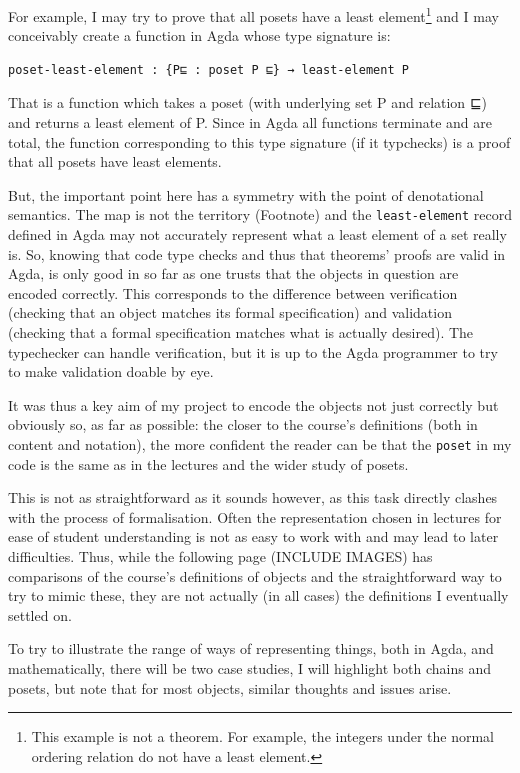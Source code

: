 \documentclass[12pt,a4paper,twoside,openright]{report}
\begin{document}
For example, I may try to prove that all posets have a least element\footnote{This example is not a theorem. For example, the integers under the normal ordering relation do not have a least element.} and I may conceivably create a function in Agda whose type signature is:
\begin{verbatim}
poset-least-element : {P⊑ : poset P ⊑} → least-element P
\end{verbatim}
That is a function which takes a poset (with underlying set P and relation ⊑) and returns a least element of P. Since in Agda all functions terminate and are total, the function corresponding to this type signature (if it typchecks) is a proof that all posets have least elements.

But, the important point here has a symmetry with the point of denotational semantics. The map is not the territory (Footnote) and the \texttt{least-element} record defined in Agda may not accurately represent what a least element of a set really is. So, knowing that code type checks and thus that theorems' proofs are valid in Agda, is only good in so far as one trusts that the objects in question are encoded correctly. This corresponds to the difference between verification (checking that an object matches its formal specification) and validation (checking that a formal specification matches what is actually desired). The typechecker can handle verification, but it is up to the Agda programmer to try to make validation doable by eye. 

It was thus a key aim of my project to encode the objects not just correctly but obviously so, as far as possible: the closer to the course's definitions (both in content and notation), the more confident the reader can be that the \texttt{poset} in my code is the same as in the lectures and the wider study of posets. 

This is not as straightforward as it sounds however, as this task directly clashes with the process of formalisation. Often the representation chosen in lectures for ease of student understanding is not as easy to work with and may lead to later difficulties. Thus, while the following page (INCLUDE IMAGES) has comparisons of the course's definitions of objects and the straightforward way to try to mimic these, they are not actually (in all cases) the definitions I eventually settled on. 

To try to illustrate the range of ways of representing things, both in Agda, and mathematically, there will be two case studies, I will highlight both chains and posets, but note that for most objects, similar thoughts and issues arise. 
\end{document}
